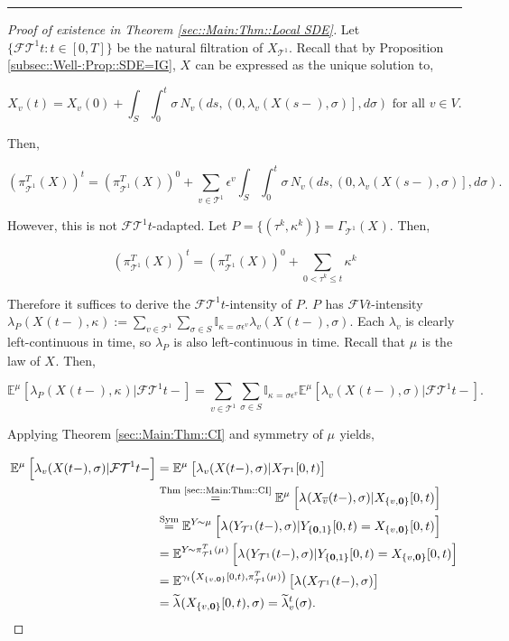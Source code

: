 \documentclass[12pt]{article}
\newcommand{\mb}{\mathbb}
\newcommand{\mc}{\mathcal}
\newcommand{\ov}{\overline}
\newcommand{\os}{\overset}
\newcommand{\te}{\text}
\newcommand{\ep}{\epsilon}
\newcommand{\lin}{\rule{\linewidth}{0.4 pt}}
\newcommand{\exmu}[2]{\mb{E}^{#1}\left[#2\right]}	%
\renewcommand{\root}{\mathbf{0}}				%
\renewcommand{\v}{v}							%
\renewcommand{\S}{S}							%
\newcommand{\s}{\sigma}							%
\newcommand{\ev}[1]{\ep^{#1}}					%
\newcommand{\T}{T}								%
\renewcommand{\t}{t}							%
\renewcommand{\tt}{s}							%
\newcommand{\F}{\mc{F}}							%
\newcommand{\cl}{\ov}							%
\newcommand{\poiss}[1]{N_{#1}}						%
\newcommand{\pup}[1]{^{#1}}							%
\newcommand{\tree}{\mc{T}}							%
\newcommand{\V}{V}									%
\newcommand{\rt}[1]{\tau^{#1}}						%
\renewcommand{\it}{k}								%
\newcommand{\piV}[2]{\pi_{#1}^{#2}}					%
\newcommand{\rxvt}[2]{X_{#1}{(#2)}}					%
\newcommand{\rxvtt}[2]{Y_{#1}{(#2)}}				%
\newcommand{\rxvts}[2]{X_{#1}{#2}}					%
\newcommand{\rxvtts}[2]{Y_{#1}{#2}}					%
\newcommand{\rp}[1]{P^{#1}}							%
\newcommand{\m}[3]{\mu_{#2#1}^{#3}}						%
\newcommand{\cm}{\gamma}							%
\newcommand{\rate}[1]{\lambda_{#1}}					%
\newcommand{\crate}[2]{\alt{\lambda}_{#1}^{#2}}		%
\newcommand{\alt}{\widetilde}						%
\renewcommand{\mark}[1]{\kappa^{#1}}				%
\newcommand{\pmap}[1]{\Gamma_{#1}}				%
\begin{document}
\lin

\begin{proof}[Proof of existence in Theorem \ref{sec::Main:Thm::Local SDE}]

Let \(\{\F{\tree\pup{1}}{\t}:\t\in [0,\T]\}\) be the natural filtration of \(\rxvts{\tree\pup{1}}{}\). Recall that by Proposition \ref{subsec::Well-:Prop::SDE=IG}, \(\rxvts{}{}\) can be expressed as the unique solution to,

\[\rxvt{\v}{\t} = \rxvt{\v}{0} + \int_\S\int_0^\t \s\,\poiss{\v}\left(d\tt,\left(0,\rate{\v}(\rxvt{}{\tt-},\s)\right],d\s\right) \te{ for all } \v \in \V.\]

Then,

\[\left(\piV{\tree\pup{1}}{\T}(\rxvts{}{})\right)^\t = \left(\piV{\tree\pup{1}}{\T}(\rxvts{}{})\right)^0 + \sum_{\v \in \tree\pup{1}}\ev{\v}\int_\S\int_0^\t \s\,\poiss{\v}\left(d\tt,\left(0,\rate{\v}(\rxvt{}{\tt-},\s)\right],d\s\right).\]

However, this is not \(\F{\tree\pup{1}}{\t}\)-adapted. Let \(\rp{} = \{(\rt{\it},\mark{\it})\} = \pmap{\tree\pup{1}}(\rxvts{}{}).\) Then,

\[\left(\piV{\tree\pup{1}}{\T}(\rxvts{}{})\right)^\t = \left(\piV{\tree\pup{1}}{\T}(\rxvts{}{})\right)^0 + \sum_{0 < \rt{\it} \leq t}\mark{\it}\]

Therefore it suffices to derive the \(\F{\tree\pup{1}}{\t}\)-intensity of \(\rp{}\). \(\rp{}\) has \(\F{\V}{\t}\)-intensity \(\rate{\rp{}}(\rxvt{}{\t-},\mark{}) := \sum_{\v \in \tree^1}\sum_{\s\in S}\mb{I}_{\mark{} = \s\ev{\v}}\rate{\v}(\rxvt{}{\t-},\s)\). Each \(\rate{\v}\) is clearly left-continuous in time, so \(\rate{\rp{}}\) is also left-continuous in time. Recall that \(\m{}{}{}\) is the law of \(\rxvts{}{}\). Then,

\[\exmu{\m{}{}{}}{\rate{\rp{}}(\rxvt{}{\t-},\mark{})|\F{\tree\pup{1}}{\t-}} = \sum_{\v \in \tree\pup{1}}\sum_{\s\in S} \mb{I}_{\mark{} = \s\ev{\v}}\exmu{\m{}{}{}}{\rate{\v}(\rxvt{}{\t-},\s)|\F{\tree\pup{1}}{\t-}}.\]

Applying Theorem \ref{sec::Main:Thm::CI} and symmetry of \(\m{}{}{}\) yields,

\begin{align*}
\exmu{\m{}{}{}}{\rate{\v}(\rxvt{}{\t-},\s)|\F{\tree\pup{1}}{\t-}} &= \exmu{\m{}{}{}}{\rate{\v}(\rxvt{}{\t-},\s)|\rxvts{\tree\pup{1}}{[0,\t)}}\\
&\os{\te{Thm \ref{sec::Main:Thm::CI}}}{=} \exmu{\m{}{}{}}{\rate{}(\rxvt{\cl{\v}}{\t-},\s)|\rxvts{\{\v,\root\}}{[0,\t)}} \\
&\os{\te{Sym}}{=} \exmu{\rxvtts{}{}\sim \m{}{}{}}{\rate{}(\rxvtt{\tree\pup{1}}{\t-},\s)|\rxvtts{\{\root,1\}}{[0,\t)} = \rxvts{\{\v,\root\}}{[0,\t)}}\\
&= \exmu{\rxvtts{}{}\sim \piV{\tree\pup{1}}{\T}(\m{}{}{})}{\rate{}(\rxvtt{\tree\pup{1}}{\t-},\s)|\rxvtts{\{\root,1\}}{[0,\t)} = \rxvts{\{\v,\root\}}{[0,\t)}}\\
&= \exmu{\cm_\t\left(\rxvts{\{\v,\root\}}{[0,\t)},\piV{\tree\pup{1}}{\T}(\m{}{}{})\right)}{\rate{}(\rxvt{\tree\pup{1}}{\t-},\s)}\\
&=\crate{}{}(\rxvts{\{\v,\root\}}{[0,\t)},\s) = \crate{\v}{\t}(\s).
\end{align*}


\end{proof}
\end{document}

